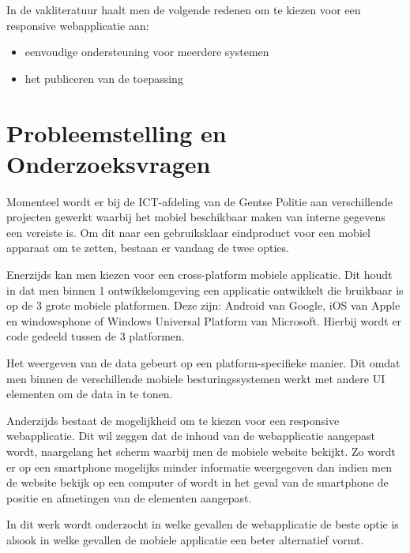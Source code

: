 In de vakliteratuur haalt men de volgende redenen om te kiezen voor een responsive webapplicatie aan:
\begin{itemize}
  \item{eenvoudige ondersteuning voor meerdere systemen}
  \item{het publiceren van de toepassing}
\end{itemize}



\section{Probleemstelling en Onderzoeksvragen}
\label{sec:onderzoeksvragen}


Momenteel wordt er bij de ICT-afdeling van de Gentse Politie aan verschillende projecten gewerkt waarbij het
mobiel beschikbaar maken van interne gegevens een vereiste is.
Om dit naar een gebruiksklaar eindproduct voor een mobiel apparaat om te zetten, bestaan er vandaag de twee opties.

Enerzijds kan men kiezen voor een cross-platform mobiele applicatie.
Dit houdt in dat men binnen 1 ontwikkelomgeving een applicatie ontwikkelt die bruikbaar is op de
3 grote mobiele platformen. Deze zijn: Android van Google, iOS van Apple en windowsphone of
Windows Universal Platform van Microsoft.
Hierbij wordt er code gedeeld tussen de 3 platformen.

Het weergeven van de data gebeurt op een platform-specifieke manier.
Dit omdat men binnen de verschillende mobiele besturingssystemen werkt met andere UI elementen om de data in te tonen.

Anderzijds bestaat de mogelijkheid om te kiezen voor een responsive webapplicatie.
Dit wil zeggen dat de inhoud van de webapplicatie aangepast wordt,
 naargelang het scherm waarbij men de mobiele website bekijkt.
Zo wordt er op een smartphone mogelijks minder informatie weergegeven dan indien men de website bekijk op een computer of
wordt in het geval van de smartphone de positie en afmetingen van de elementen aangepast.

In dit werk wordt onderzocht in welke gevallen de webapplicatie de beste optie is alsook in welke gevallen de mobiele applicatie
een beter alternatief vormt.

